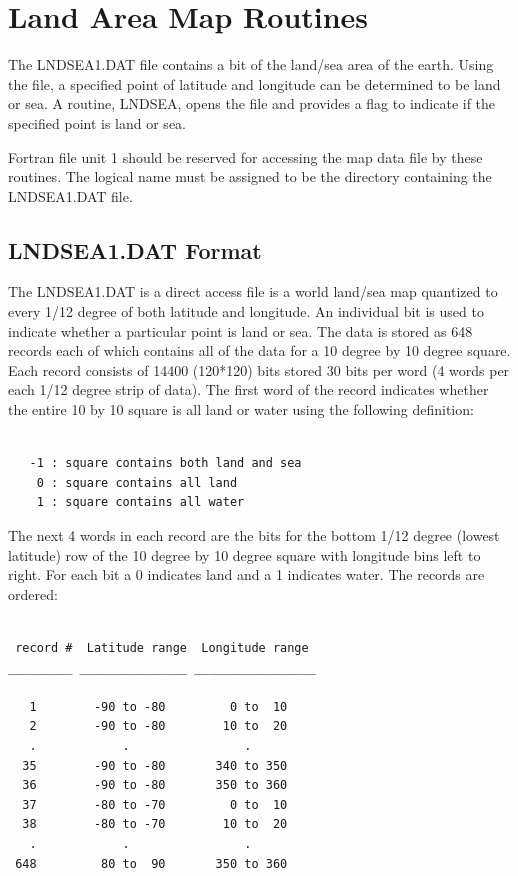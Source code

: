 \documentclass[11pt]{report}
\begin{document}
\section{Land Area Map Routines}

The LNDSEA1.DAT file contains a bit  of the land/sea area of
the earth.  Using the file, a specified point of latitude and
longitude can be determined to be land or sea.  A routine, LNDSEA,
opens the file and provides a flag to indicate if the specified point
is land or sea.

Fortran file unit 1 should be reserved for accessing the map data
file by these routines.  The logical name  must be assigned
to be the directory containing the LNDSEA1.DAT file.

\subsection{LNDSEA1.DAT Format}

The LNDSEA1.DAT is a direct access file is a world land/sea map
quantized to every 1/12 degree of both latitude and longitude.  An
individual bit is used to indicate whether a particular point is land
or sea.  The data is stored as 648 records each of which contains all
of the data for a 10 degree by 10 degree square.  Each record consists
of 14400 (120*120) bits stored 30 bits per word (4 words per each 1/12
degree strip of data).  The first word of the record indicates whether
the entire 10 by 10 square is all land or water using the following
definition:
\begin{verbatim}

   -1 : square contains both land and sea
    0 : square contains all land
    1 : square contains all water

\end{verbatim}
The next 4 words in each record are the bits for the bottom 1/12 degree
(lowest latitude) row of the 10 degree by 10 degree square with 
longitude bins left to right.  For each bit a 0 indicates land and a
1 indicates water.  The records are ordered:
\begin{verbatim}

 record #  Latitude range  Longitude range
_________ _______________ _________________

   1        -90 to -80         0 to  10
   2        -90 to -80        10 to  20
   .            .                .
  35        -90 to -80       340 to 350
  36        -90 to -80       350 to 360
  37        -80 to -70         0 to  10
  38        -80 to -70        10 to  20
   .            .                .
 648         80 to  90       350 to 360
\end{verbatim}
\end{document}

